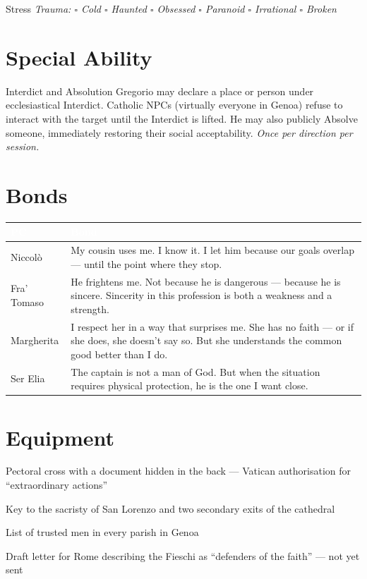 \medskip
\begin{pgclockbox}{Stress \hfill {}}
\small\textit{Trauma: $\square$ Cold \quad $\square$ Haunted \quad $\square$ Obsessed \quad $\square$ Paranoid \quad $\square$ Irrational \quad $\square$ Broken}
\end{pgclockbox}

\section*{Special Ability}
\begin{fieschibox}{Interdict and Absolution}
Gregorio may declare a place or person under ecclesiastical Interdict. Catholic
NPCs (virtually everyone in Genoa) refuse to interact with the target until the
Interdict is lifted. He may also publicly Absolve someone, immediately restoring
their social acceptability. \textit{Once per direction per session.}
\end{fieschibox}

\section*{Bonds}
\begin{table}[h]\centering\renewcommand{\arraystretch}{1.4}
\begin{tabularx}{\linewidth}{@{}L{2.6cm} X@{}}
\toprule{}
\textcolor{white}{\textbf{PC}} & \textcolor{white}{\textbf{Bond}} \\
\midrule
Niccol\`o & My cousin uses me. I know it. I let him because our goals overlap --- until the point where they stop. \\
Fra' Tomaso & He frightens me. Not because he is dangerous --- because he is sincere. Sincerity in this profession is both a weakness and a strength. \\
Margherita & I respect her in a way that surprises me. She has no faith --- or if she does, she doesn't say so. But she understands the common good better than I do. \\
Ser Elia & The captain is not a man of God. But when the situation requires physical protection, he is the one I want close. \\
\bottomrule
\end{tabularx}
\end{table}

\section*{Equipment}
\begin{goldlist}
\item Pectoral cross with a document hidden in the back --- Vatican authorisation for ``extraordinary actions''
\item Key to the sacristy of San Lorenzo and two secondary exits of the cathedral
\item List of trusted men in every parish in Genoa
\item Draft letter for Rome describing the Fieschi as ``defenders of the faith'' --- not yet sent
\end{goldlist}


